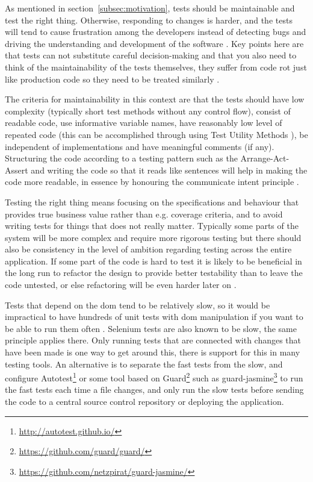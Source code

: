 \documentclass[11pt]{article}
\begin{document}
As mentioned in section~\ref{subsec:motivation}, tests should be maintainable and test the right thing. Otherwise, responding to changes is harder, and the tests will tend to cause frustration among the developers instead of detecting bugs and driving the understanding and development of the software \cite{Clean}. Key points here are that tests can not substitute careful decision-making and that you also need to think of the maintainability of the tests themselves, they suffer from code rot just like production code so they need to be treated similarly \cite[question~36]{Ahnve}\cite[p.~123-133]{Clean}.

The criteria for maintainability in this context are that the tests should have low complexity (typically short test methods without any control flow), consist of readable code, use informative variable names, have reasonably low level of repeated code (this can be accomplished through using Test Utility Methods \cite[599]{TestPatterns}), be independent of implementations and have meaningful comments (if any). Structuring the code according to a testing pattern such as the Arrange-Act-Assert \cite{C2} and writing the code so that it reads like sentences will help in making the code more readable, in essence by honouring the communicate intent principle \cite[p.~41]{TestPatterns}.

Testing the right thing means focusing on the specifications and behaviour that provides true business value rather than e.g. coverage criteria, and to avoid writing tests for things that does not really matter. Typically some parts of the system will be more complex and require more rigorous testing but there should also be consistency in the level of ambition regarding testing across the entire application. If some part of the code is hard to test it is likely to be beneficial in the long run to refactor the design to provide better testability than to leave the code untested, or else refactoring will be even harder later on \cite{Refactoring}. %

Tests that depend on the \gls{dom} tend to be relatively slow, so it would be impractical to have hundreds of unit tests with \gls{dom} manipulation if you want to be able to run them often \cite[questions~21-22]{Stenmark}. Selenium tests are also known to be slow, the same principle applies there. Only running tests that are connected with changes that have been made is one way to get around this, there is support for this in many testing tools. An alternative is to separate the fast tests from the slow, and configure Autotest\footnote{\url{http://autotest.github.io/}} or some tool based on Guard\footnote{\url{https://github.com/guard/guard/}} such as guard-jasmine\footnote{\url{https://github.com/netzpirat/guard-jasmine/}} to run the fast tests each time a file changes, and only run the slow tests before sending the code to a central source control repository or deploying the application.
\end{document}

